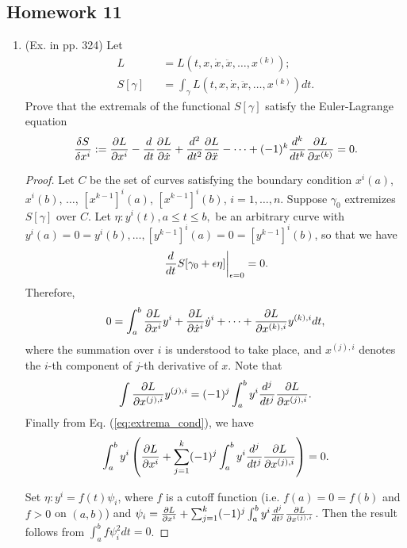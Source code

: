 \subsection{Homework 11}
\begin{enumerate}
	\item (Ex. in pp. 324) Let
	\begin{eqnarray}
	L &&= L(t, x, \dot{x}, \ddot{x}, \dots, x^{(k)});
	\nonumber\\
	S[\gamma] &&= \int_{\gamma} L(t, x, \dot{x}, \ddot{x}, \dots, x^{(k)}) dt.
	\end{eqnarray}
	Prove that the extremals of the functional $S[\gamma]$ satisfy the Euler-Lagrange equation
	\begin{eqnarray}
		\frac{\delta S}{\delta x^i} := \pardiff{L}{x^i} - \diff{}{t}\pardiff{L}{\dot{x}} + \diff[2]{ }{t} \pardiff{L}{\ddot{x}} - \cdots + (-1)^k \diff[k]{ }{t} \pardiff{L}{x^{(k)}} = 0.
	\end{eqnarray}
	
	\begin{proof}
		Let $C$ be the set of curves satisfying the boundary condition $x^i(a)$, $x^i(b)$, $\dots$, $[x^{k-1}]^i(a)$, $[x^{k-1}]^i(b)$, $i = 1, \dots, n$. Suppose $\gamma_0$ extremizes $S[\gamma]$ over $C$. Let $\eta: y^i(t), a \leq t \leq b,$ be an arbitrary curve with $y^i(a) = 0 = y^i(b), \dots, [y^{k-1}]^i(a) = 0 = [y^{k-1}]^i(b)$, so that we have \[ \left. \diff{ }{t} S[\gamma_0 + \epsilon \eta] \right|_{\epsilon = 0}  = 0.\] Therefore,
		\begin{eqnarray}
			0 = \int_{a}^{b} \pardiff{L}{x^i} y^i + \pardiff{L}{\dot{x}^i} \dot{y}^i + \dots + \pardiff{L}{x^{(k), i}} y^{(k), i} dt,
			\label{eq:extrema_cond}
		\end{eqnarray}
		where the summation over $i$ is understood to take place, and $x^{(j), i}$ denotes the $i$-th component of $j$-th derivative of $x$. Note that
		\[ \int \pardiff{L}{x^{(j), i}} y^{(j), i} = (-1)^{j} \int_{a}^{b} y^i \diff[j]{ }{t} \pardiff{L}{x^{(j), i}}.\]
		Finally from Eq. (\ref{eq:extrema_cond}), we have
		\begin{eqnarray}
			\int_{a}^{b} y^i \left( \pardiff{L}{x^i} + \sum_{j = 1}^{k} (-1)^{j} \int_{a}^{b} y^i \diff[j]{ }{t} \pardiff{L}{x^{(j), i}} \right) = 0.
		\end{eqnarray}
		
		Set $\eta: y^i = f(t) \psi_i$, where $f$ is a cutoff function (i.e. $f(a) = 0 = f(b)$ and $f > 0$ on $(a, b)$) and $\psi_i = \pardiff{L}{x^i} + \sum_{j = 1}^{k} (-1)^{j} \int_{a}^{b} y^i \diff[j]{ }{t} \pardiff{L}{x^{(j), i}}$. Then the result follows from $\int_{a}^{b} f \psi_i^2 dt= 0$.
	\end{proof}
	

\end{enumerate}

